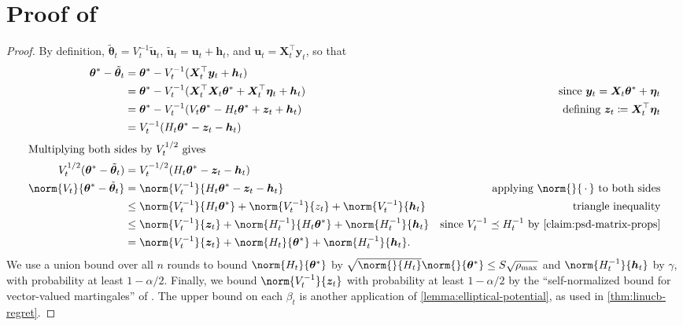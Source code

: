\documentclass{article}
\renewcommand{\vec}[1]{\bm{#1}}
\newcommand{\wildcard}{\mathinner{\,{\cdot}\,}}
\newcommand{\defeq}{\coloneq}
\newcommand{\inv}[1]{#1^{-1}}
\providecommand\transp{\top}
\let\transpsymbol\transp
\renewcommand{\transp}[1]{#1^\transpsymbol}
\begin{document}
\newpage

\appendix

\section{Proof of }

\CalcBeta*

\begin{proof}
  By definition, $\tilde{\vec\theta}_t = \inv{V_t} \tilde{\vec u}_t$,
  $\tilde{\vec u}_t = \vec u_t + \vec h_t$, and $\vec u_t = \transp{\vec
    X_t} \vec y_t$, so that
  \begin{align*}
    \vec\theta^* - \tilde{\vec\theta}_t
    &= \vec\theta^* - \inv{V_t}(\transp{\vec X_t} \vec y_t + \vec h_t) \\
    &= \vec\theta^* - \inv{V_t}(\transp{\vec X_t} \vec X_t \vec\theta^*
      + \transp{\vec X_t} \vec\eta_t + \vec h_t)
    &\text{since } \vec y_t = \vec X_t \vec\theta^* + \vec\eta_t \\
    &= \vec\theta^* - \inv{V_t}(V_t \vec\theta^* - H_t \vec\theta^* + \vec z_t + \vec h_t)
    &\text{defining } \vec z_t \defeq \transp{\vec X_t} \vec\eta_t \\
    &= \inv{V_t}(H_t\vec\theta^* - \vec z_t - \vec h_t) \\
    \shortintertext{Multiplying both sides by $V_t^{1/2}$ gives}
    V_t^{1/2}(\vec\theta^* - \tilde{\vec\theta}_t)
    &= V_t^{-1/2}(H_t\vec\theta^* - \vec z_t - \vec h_t) \\
    \norm{V_t}{\vec\theta^* - \tilde{\vec\theta}_t}
    &= \norm{\inv{V_t}}{H_t\vec\theta^* - \vec z_t - \vec h_t}
    &\text{applying $\norm{}{\wildcard}$ to both sides}\\
    &\le \norm{\inv{V_t}}{H_t\vec\theta^*} + \norm{\inv{V_t}}{z_t}
      + \norm{\inv{V_t}}{\vec h_t} &\text{triangle inequality} \\
    &\le \norm{\inv{V_t}}{\vec z_t} + \norm{\inv{H_t}}{H_t\vec\theta^*}
      + \norm{\inv{H_t}}{\vec h_t}
    &\text{since $\inv{V_t} \preceq \inv{H_t}$ by \cref{claim:psd-matrix-props}} \\
    &= \norm{\inv{V_t}}{\vec z_t} + \norm{H_t}{\vec\theta^*} +
      \norm{\inv{H_t}}{\vec h_t}.
    &\qedhere
  \end{align*}
  We use a union bound over all $n$ rounds to bound
  $\norm{H_t}{\vec\theta^*}$ by
  $\sqrt{\norm{}{H_t}}\norm{}{\vec\theta^*} \le S\sqrt{\rho_{\max}}$
  and $\norm{\inv{H_t}}{\vec h_t}$ by $\gamma$, with probability at
  least $1-\alpha/2$.  Finally, we bound $\norm{\inv{V_t}}{\vec z_t}$
  with probability at least $1-\alpha/2$ by the ``self-normalized
  bound for vector-valued martingales'' of
  \citet[Theorem~1]{AbbasiYadkoriImprovedAlgorithmsLinear2011}.  The
  upper bound on each $\beta_t$ is another application of
  \cref{lemma:elliptical-potential}, as used in
  \cref{thm:linucb-regret}.
\end{proof}
\end{document}
